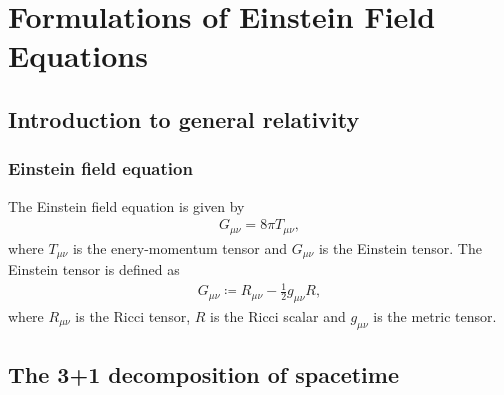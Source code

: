 
\chapter{Formulations of Einstein Field Equations}  %

\ifpdf
    \graphicspath{{Chapter1/Figs/PDF/}{Chapter1/Figs/}}
\else
    \graphicspath{{Chapter1/Figs/}}
\fi


\section{Introduction to general relativity} %
\label{section1.1}

\subsection{Einstein field equation} %
\label{section1.1.1}

The Einstein field equation is given by
\begin{align} \label{eq:Einstein_eq}
    G_{\mu\nu} = 8 \pi T_{\mu\nu},
\end{align}
where $T_{\mu\nu}$ is the enery-momentum tensor and $G_{\mu\nu}$ is the Einstein tensor.
The Einstein tensor is defined as
\begin{align}
    G_{\mu\nu} \coloneqq R_{\mu\nu} - \frac{1}{2} g_{\mu\nu} R,
\end{align}
where $R_{\mu\nu}$ is the Ricci tensor,
$R$ is the Ricci scalar
and $g_{\mu\nu}$ is the metric tensor.


\section{The 3+1 decomposition of spacetime} %
\label{section1.2}

